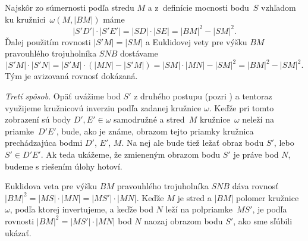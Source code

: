 {Najskôr zo súmernosti podľa stredu $M$ a z~definície
mocnosti bodu~$S$ vzhľadom ku kružnici~$\omega(M,|BM|)$ máme
$$
|S'D'|\cdot|S'E'| =|SD|\cdot|SE| =|BM|^2-|SM|^2.
$$
Ďalej použitím rovnosti $|S'M|=|SM|$ a
Euklidovej vety pre výšku $BM$ pravouhlého trojuholníka $SNB$
dostávame
$$
|S'M|\cdot|S'N|=|S'M|\cdot (|MN|-|S'M|) =|SM|\cdot|MN|
-|SM|^2 = |BM|^2-|SM|^2.
$$
Tým je avizovaná rovnosť dokázaná.

\medskip
\emph{Tretí spôsob}. Opäť uvážime bod $S'$ z druhého postupu
(pozri ) a tentoraz využijeme kružnicovú inverziu
podľa zadanej kružnice $\omega$. Keďže pri tomto zobrazení
sú body $D',E'\in\omega$ samodružné a stred~$M$ kružnice~$\omega$
neleží na priamke~$D'E'$, bude, ako je známe, obrazom tejto priamky
kružnica prechádzajúca bodmi $D'$, $E'$, $M$. Na nej ale bude
tiež ležať obraz bodu $S'$, lebo $S'\in D'E'$. Ak teda ukážeme, že zmieneným obrazom bodu $S'$ je práve bod $N$,
budeme s riešením úlohy hotoví.

Euklidova veta pre výšku $BM$ pravouhlého trojuholníka
$SNB$ dáva rovnosť $|BM|^2=|MS|\cdot |MN|=|MS'|\cdot |MN|$.
Keďže $M$ je stred a $|BM|$ polomer kružnice~$\omega$,
podľa ktorej invertujeme, a keďže bod $N$ leží na
polpriamke~$MS'$,
je podľa rovnosti $|BM|^2=|MS'|\cdot|MN|$ bod $N$ naozaj
obrazom bodu $S'$, ako sme sľúbili ukázať.
}

